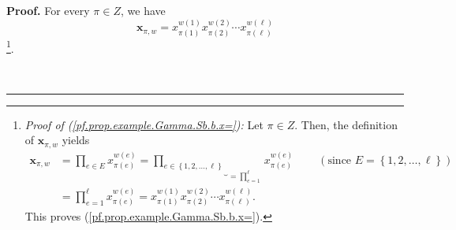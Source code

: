 \documentclass[numbers=enddot,12pt,final,onecolumn,notitlepage,abstracton]{scrartcl}
\theoremstyle{definition}
\newenvironment{proof}[1][Proof]{\noindent\textbf{#1.} }{\ \rule{0.5em}{0.5em}}
\let\prodnonlimits\prod
\renewcommand{\prod}{\prodnonlimits\limits}
\newenvironment{verlong}{}{}
\begin{document}
\begin{verlong}
\begin{footnotesize}
\begin{proof}
For every $\pi\in Z$, we have%
\begin{equation}
\mathbf{x}_{\pi,w}=x_{\pi\left(  1\right)  }^{w\left(  1\right)  }%
x_{\pi\left(  2\right)  }^{w\left(  2\right)  }\cdots x_{\pi\left(
\ell\right)  }^{w\left(  \ell\right)  } \label{pf.prop.example.Gamma.Sb.b.x=}%
\end{equation}
\footnote{\textit{Proof of (\ref{pf.prop.example.Gamma.Sb.b.x=}):} Let $\pi\in
Z$. Then, the definition of $\mathbf{x}_{\pi,w}$ yields%
\begin{align*}
{\mathbf{x}}_{\pi,w}  &  =\prod_{e\in E}x_{\pi\left(  e\right)  }^{w\left(
e\right)  }=\underbrace{\prod_{e\in\left\{  1,2,\ldots,\ell\right\}  }%
}_{=\prod_{e=1}^{\ell}}x_{\pi\left(  e\right)  }^{w\left(  e\right)
}\ \ \ \ \ \ \ \ \ \ \left(  \text{since }E=\left\{  1,2,\ldots,\ell\right\}
\right) \\
&  =\prod_{e=1}^{\ell}x_{\pi\left(  e\right)  }^{w\left(  e\right)  }%
=x_{\pi\left(  1\right)  }^{w\left(  1\right)  }x_{\pi\left(  2\right)
}^{w\left(  2\right)  }\cdots x_{\pi\left(  \ell\right)  }^{w\left(
\ell\right)  }.
\end{align*}
This proves (\ref{pf.prop.example.Gamma.Sb.b.x=}).}.


\end{proof}
\end{footnotesize}
\end{verlong}
\end{document}
